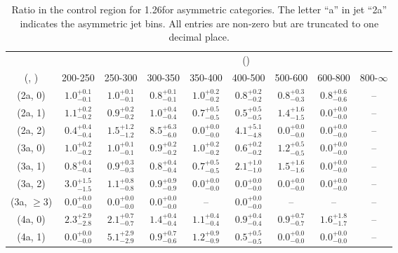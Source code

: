 \begin{table}[h!]
\tiny
\centering
\caption{Ratio in the \mmj control region for 1.26\ifb for asymmetric categories. The letter ``a'' in jet \eg ``2a''  indicates the asymmetric jet bins. All entries are non-zero but are truncated to one decimal place.\label{tab:ratiosep_mumu_ewk_asym}}
\begin{tabular}
{ccccccccc}
	\hline\hline
&	& \multicolumn{8}{c}{\scalht (\gev)} \\ 
	 (\njet,  \nb) & 200-250 & 250-300 & 300-350 & 350-400 & 400-500 & 500-600 & 600-800 & 800-$\infty$ \\ [0.8ex] 
\hline
	(2a, 0) & $1.0^{+ 0.1 }_{- 0.1 }$ & $1.0^{+ 0.1 }_{- 0.1 }$ & $0.8^{+ 0.1 }_{- 0.1 }$ & $1.0^{+ 0.2 }_{- 0.2 }$ & $0.8^{+ 0.2 }_{- 0.2 }$ & $0.8^{+ 0.3 }_{- 0.3 }$ & $0.8^{+ 0.6 }_{- 0.6 }$ & -- \\[0.5ex] 
	(2a, 1) & $1.1^{+ 0.2 }_{- 0.2 }$ & $0.9^{+ 0.2 }_{- 0.2 }$ & $1.0^{+ 0.4 }_{- 0.4 }$ & $0.7^{+ 0.5 }_{- 0.5 }$ & $0.5^{+ 0.5 }_{- 0.5 }$ & $1.4^{+ 1.6 }_{- 1.5 }$ & $0.0^{+ 0.0 }_{- 0.0 }$ & -- \\[0.5ex] 
	(2a, 2) & $0.4^{+ 0.4 }_{- 0.4 }$ & $1.5^{+ 1.2 }_{- 1.2 }$ & $8.5^{+ 6.3 }_{- 6.0 }$ & $0.0^{+ 0.0 }_{- 0.0 }$ & $4.1^{+ 5.1 }_{- 4.8 }$ & $0.0^{+ 0.0 }_{- 0.0 }$ & $0.0^{+ 0.0 }_{- 0.0 }$ & -- \\[0.5ex] 
	(3a, 0) & $1.0^{+ 0.2 }_{- 0.2 }$ & $1.0^{+ 0.1 }_{- 0.1 }$ & $0.9^{+ 0.2 }_{- 0.2 }$ & $1.0^{+ 0.2 }_{- 0.2 }$ & $0.6^{+ 0.2 }_{- 0.2 }$ & $1.2^{+ 0.5 }_{- 0.5 }$ & $0.0^{+ 0.0 }_{- 0.0 }$ & -- \\[0.5ex] 
	(3a, 1) & $0.8^{+ 0.4 }_{- 0.4 }$ & $0.9^{+ 0.3 }_{- 0.3 }$ & $0.8^{+ 0.4 }_{- 0.4 }$ & $0.7^{+ 0.5 }_{- 0.5 }$ & $2.1^{+ 1.0 }_{- 1.0 }$ & $1.5^{+ 1.6 }_{- 1.6 }$ & $0.0^{+ 0.0 }_{- 0.0 }$ & -- \\[0.5ex] 
	(3a, 2) & $3.0^{+ 1.5 }_{- 1.5 }$ & $1.1^{+ 0.8 }_{- 0.8 }$ & $0.9^{+ 0.9 }_{- 0.9 }$ & $0.0^{+ 0.0 }_{- 0.0 }$ & $0.0^{+ 0.0 }_{- 0.0 }$ & $0.0^{+ 0.0 }_{- 0.0 }$ & $0.0^{+ 0.0 }_{- 0.0 }$ & -- \\[0.5ex] 
	(3a, $\ge3$) & $0.0^{+ 0.0 }_{- 0.0 }$ & $0.0^{+ 0.0 }_{- 0.0 }$ & $0.0^{+ 0.0 }_{- 0.0 }$ & -- & $0.0^{+ 0.0 }_{- 0.0 }$ & -- & -- & -- \\[0.5ex] 
	(4a, 0) & $2.3^{+ 2.9 }_{- 2.8 }$ & $2.1^{+ 0.7 }_{- 0.7 }$ & $1.4^{+ 0.4 }_{- 0.4 }$ & $1.1^{+ 0.4 }_{- 0.4 }$ & $0.9^{+ 0.4 }_{- 0.4 }$ & $0.9^{+ 0.7 }_{- 0.7 }$ & $1.6^{+ 1.8 }_{- 1.7 }$ & -- \\[0.5ex] 
	(4a, 1) & $0.0^{+ 0.0 }_{- 0.0 }$ & $5.1^{+ 2.9 }_{- 2.9 }$ & $0.9^{+ 0.7 }_{- 0.6 }$ & $1.2^{+ 0.9 }_{- 0.9 }$ & $0.5^{+ 0.5 }_{- 0.5 }$ & $0.0^{+ 0.0 }_{- 0.0 }$ & $0.0^{+ 0.0 }_{- 0.0 }$ & -- \\[0.5ex] 

\end{tabular}
\end{table}
